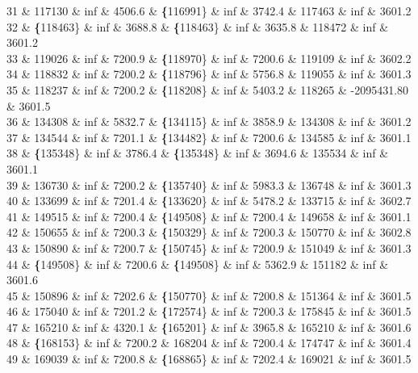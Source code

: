 31 \& 117130 \& inf \& 4506.6 \& \textbf\{116991\} \& inf \& 3742.4 \& 117463 \& inf \& 3601.2 \\
32 \& \textbf\{118463\} \& inf \& 3688.8 \& \textbf\{118463\} \& inf \& 3635.8 \& 118472 \& inf \& 3601.2 \\
33 \& 119026 \& inf \& 7200.9 \& \textbf\{118970\} \& inf \& 7200.6 \& 119109 \& inf \& 3602.2 \\
34 \& 118832 \& inf \& 7200.2 \& \textbf\{118796\} \& inf \& 5756.8 \& 119055 \& inf \& 3601.3 \\
35 \& 118237 \& inf \& 7200.2 \& \textbf\{118208\} \& inf \& 5403.2 \& 118265 \& -2095431.80 \& 3601.5 \\
36 \& 134308 \& inf \& 5832.7 \& \textbf\{134115\} \& inf \& 3858.9 \& 134308 \& inf \& 3601.2 \\
37 \& 134544 \& inf \& 7201.1 \& \textbf\{134482\} \& inf \& 7200.6 \& 134585 \& inf \& 3601.1 \\
38 \& \textbf\{135348\} \& inf \& 3786.4 \& \textbf\{135348\} \& inf \& 3694.6 \& 135534 \& inf \& 3601.1 \\
39 \& 136730 \& inf \& 7200.2 \& \textbf\{135740\} \& inf \& 5983.3 \& 136748 \& inf \& 3601.3 \\
40 \& 133699 \& inf \& 7201.4 \& \textbf\{133620\} \& inf \& 5478.2 \& 133715 \& inf \& 3602.7 \\
41 \& 149515 \& inf \& 7200.4 \& \textbf\{149508\} \& inf \& 7200.4 \& 149658 \& inf \& 3601.1 \\
42 \& 150655 \& inf \& 7200.3 \& \textbf\{150329\} \& inf \& 7200.3 \& 150770 \& inf \& 3602.8 \\
43 \& 150890 \& inf \& 7200.7 \& \textbf\{150745\} \& inf \& 7200.9 \& 151049 \& inf \& 3601.3 \\
44 \& \textbf\{149508\} \& inf \& 7200.6 \& \textbf\{149508\} \& inf \& 5362.9 \& 151182 \& inf \& 3601.6 \\
45 \& 150896 \& inf \& 7202.6 \& \textbf\{150770\} \& inf \& 7200.8 \& 151364 \& inf \& 3601.5 \\
46 \& 175040 \& inf \& 7201.2 \& \textbf\{172574\} \& inf \& 7200.3 \& 175845 \& inf \& 3601.5 \\
47 \& 165210 \& inf \& 4320.1 \& \textbf\{165201\} \& inf \& 3965.8 \& 165210 \& inf \& 3601.6 \\
48 \& \textbf\{168153\} \& inf \& 7200.2 \& 168204 \& inf \& 7200.4 \& 174747 \& inf \& 3601.4 \\
49 \& 169039 \& inf \& 7200.8 \& \textbf\{168865\} \& inf \& 7202.4 \& 169021 \& inf \& 3601.5 \\
